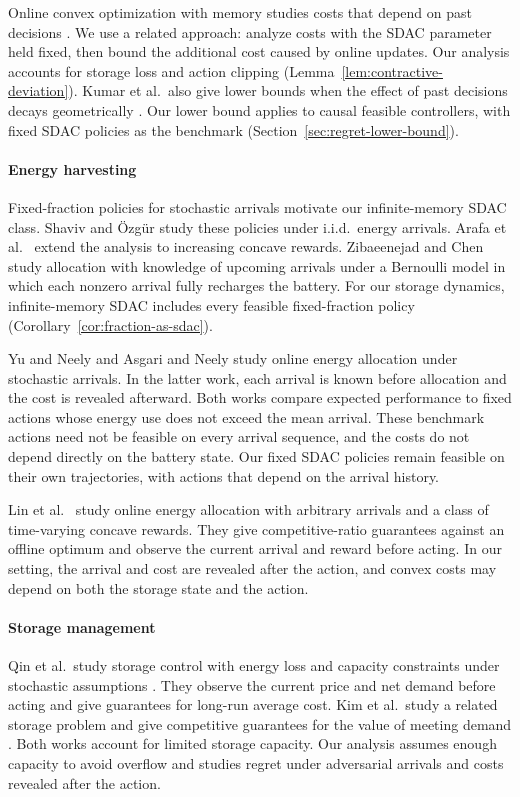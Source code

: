 \documentclass[journal]{IEEEtran}
\theoremstyle{remark}
\begin{document}
Online convex optimization with memory studies costs that depend on past
decisions \cite{anava2015memory,kumar2023unbounded}. We use a related
approach: analyze costs with the SDAC parameter held fixed, then bound
the additional cost caused by online updates. Our analysis accounts for
storage loss and action clipping (Lemma~\ref{lem:contractive-deviation}).
Kumar et al.\ also give lower bounds when the effect of past decisions
decays geometrically \cite{kumar2023unbounded}. Our lower bound applies to
causal feasible controllers, with fixed SDAC policies as the benchmark
(Section~\ref{sec:regret-lower-bound}).


\paragraph{Energy harvesting}
Fixed-fraction policies for stochastic arrivals motivate our infinite-memory
SDAC class. Shaviv and \"Ozg\"ur \cite{shaviv2016universally} study these
policies under i.i.d.\ energy arrivals. Arafa et al.\ \cite{arafa2018online}
extend the analysis to increasing concave rewards. Zibaeenejad and Chen
\cite{zibaeenejad2019lookahead} study allocation with knowledge of upcoming
arrivals under a Bernoulli model in which each nonzero arrival fully
recharges the battery. For our storage dynamics, infinite-memory SDAC
includes every feasible fixed-fraction policy
(Corollary~\ref{cor:fraction-as-sdac}).

Yu and Neely \cite{Yu2019} and Asgari and Neely \cite{10.1145/3428337}
study online energy allocation under stochastic arrivals. In the latter
work, each arrival is known before allocation and the cost is revealed
afterward. Both works compare expected performance to fixed actions whose
energy use does not exceed the mean arrival. These benchmark actions need
not be feasible on every arrival sequence, and the costs do not depend
directly on the battery state. Our fixed SDAC policies remain feasible on
their own trajectories, with actions that depend on the arrival history.

Lin et al.\ \cite{lin2025optimal} study online energy allocation with
arbitrary arrivals and a class of time-varying concave rewards. They give
competitive-ratio guarantees against an offline optimum and observe the current
arrival and reward before acting. In our setting, the arrival and cost are
revealed after the action, and convex costs may depend on both the storage
state and the action.

\paragraph{Storage management}
Qin et al.\ study storage control with energy loss and capacity constraints
under stochastic assumptions \cite{qin2016online}. They observe the current
price and net demand before acting and give guarantees for long-run average
cost. Kim et al.\ study a related storage problem and give competitive
guarantees for the value of meeting demand \cite{kim2016storage}.
Both works account for limited storage capacity. Our analysis assumes
enough capacity to avoid overflow and studies regret under adversarial
arrivals and costs revealed after the action.
\end{document}
